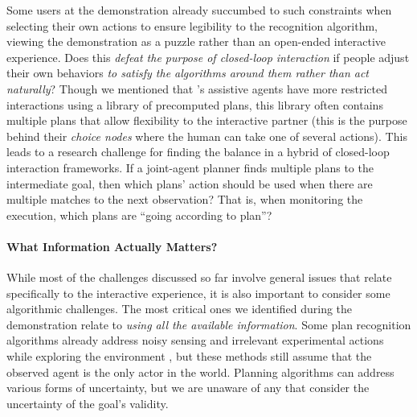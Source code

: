 \documentclass[letterpaper]{article} %
\begin{document}
Some users at the demonstration already succumbed to such constraints when selecting their own actions to ensure legibility to the recognition algorithm, viewing the demonstration as a puzzle rather than an open-ended interactive experience.  Does this \textit{defeat the purpose of closed-loop interaction} if people adjust their own behaviors \textit{to satisfy the algorithms around them rather than act naturally}?  Though we mentioned that \citeauthor{jair_levineWilliams}'s  assistive agents have more restricted interactions using %
 a library of precomputed plans, this library often contains multiple plans that allow flexibility to the interactive partner (this is the purpose behind their \textit{choice nodes} where the human can take one of several actions).  This leads to a research challenge for finding the balance in a hybrid of closed-loop interaction frameworks.  If a joint-agent planner finds multiple plans to the intermediate goal, then which plans' action should be used when there are multiple matches to the next observation?  That is, when monitoring the execution, which plans are ``going according to plan''?




\vspace{-13.5pt}
\paragraph{What Information Actually Matters?} While most of the challenges discussed so far involve general issues that relate specifically to the interactive experience, it is also important to consider some algorithmic challenges. %
 The most critical ones we identified during the demonstration relate to \textit{using all the available information}.  Some plan recognition algorithms already address noisy sensing \cite{DBLP:conf/ijcai/SohrabiRU16} and irrelevant experimental actions while exploring the environment \cite{DBLP:journals/tist/MirskyGS17}, but these methods still assume that the observed agent is the only actor in the world.  Planning algorithms can address various forms of uncertainty, but we are unaware of any that consider the uncertainty of the goal's validity.
\end{document}
